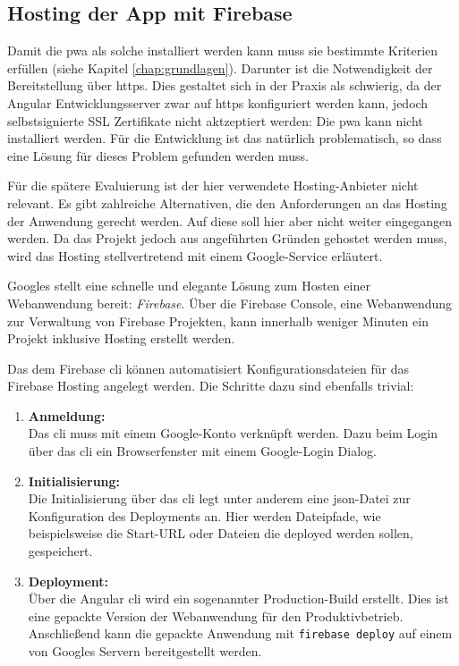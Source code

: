 \subsection{Hosting der App mit Firebase}
Damit die \ac{pwa} als solche installiert werden kann muss sie bestimmte Kriterien erfüllen (siehe Kapitel \ref{chap:grundlagen}). Darunter ist die Notwendigkeit der Bereitstellung über \ac{https}. Dies gestaltet sich in der Praxis als schwierig, da der Angular Entwicklungsserver zwar auf \ac{https} konfiguriert werden kann, jedoch selbstsignierte SSL Zertifikate nicht aktzeptiert werden: Die \ac{pwa} kann nicht installiert werden. Für die Entwicklung ist das natürlich problematisch, so dass eine Lösung für dieses Problem gefunden werden muss.

Für die spätere Evaluierung ist der hier verwendete Hosting-Anbieter nicht relevant. Es gibt zahlreiche Alternativen, die den Anforderungen an das Hosting der Anwendung gerecht werden. Auf diese soll hier aber nicht weiter eingegangen werden. Da das Projekt jedoch aus angeführten Gründen gehostet werden muss, wird das Hosting stellvertretend mit einem Google-Service erläutert.

Googles stellt eine schnelle und elegante Lösung zum Hosten einer Webanwendung bereit: \textit{Firebase}. Über die Firebase Console, eine Webanwendung zur Verwaltung von Firebase Projekten, kann innerhalb weniger Minuten ein Projekt inklusive Hosting erstellt werden. 



Das dem Firebase \ac{cli} können automatisiert Konfigurationsdateien für das Firebase Hosting angelegt werden. Die Schritte dazu sind ebenfalls trivial:
\begin{enumerate}
	\item \textbf{Anmeldung: \\}
	      Das \ac{cli} muss mit einem Google-Konto verknüpft werden. Dazu beim Login über das \ac{cli} ein Browserfenster mit einem Google-Login Dialog.
	\item \textbf{Initialisierung: \\}
	      Die Initialisierung über das \ac{cli} legt unter anderem eine \ac{json}-Datei zur Konfiguration des Deployments an. Hier werden Dateipfade, wie beispielsweise die Start-URL oder Dateien die deployed werden sollen, gespeichert.
	\item \textbf{Deployment: \\}
	      Über die Angular \ac{cli} wird ein sogenannter Production-Build erstellt. Dies ist eine gepackte Version der Webanwendung für den Produktivbetrieb.
	      Anschließend kann die gepackte Anwendung mit \texttt{firebase deploy} auf einem von Googles Servern bereitgestellt werden.
\end{enumerate}

